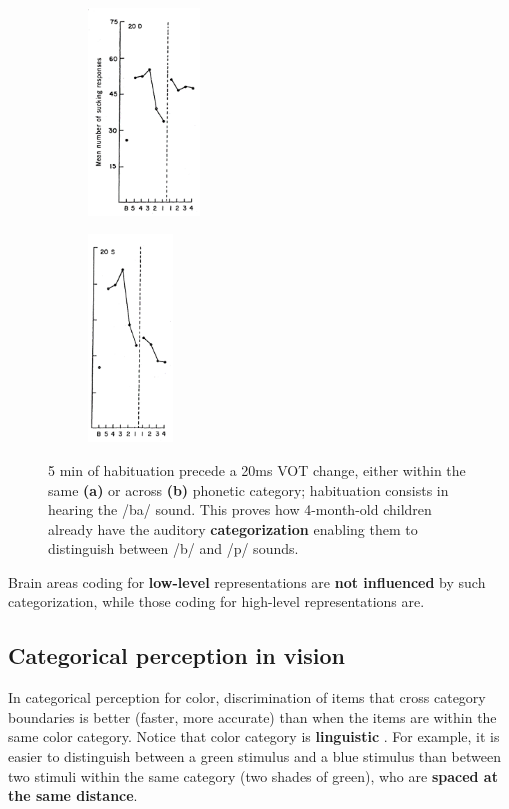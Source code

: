 \begin{figure}
  \begin{subfigure}{.22\textwidth}
  \centering
    \includegraphics[height=5.5cm]{images/eimas_a.png}
    \caption{}
  \end{subfigure}%
  \begin{subfigure}{.2\textwidth}
  \centering
    \includegraphics[height=5.5cm]{images/eimas_b.png}
    \caption{}
  \end{subfigure}
  \caption{5 min of habituation precede a 20ms VOT change, either within the same \textbf{(a)} or across \textbf{(b)} phonetic category; habituation consists in hearing the /ba/ sound. This proves how 4-month-old children already have the auditory \textbf{categorization} enabling them to distinguish between /b/ and /p/ sounds.}
    \label{fig:eimas}
\end{figure}

Brain areas coding for \textbf{low-level} representations are \textbf{not influenced} by such categorization, while those coding for high-level representations are.

\subsection{Categorical perception in vision}
In categorical perception for color, discrimination of items that cross category boundaries is better (faster, more accurate) than when the items are within the same color category. Notice that color category is \textbf{linguistic} \notet.
For example, it is easier to distinguish between a green stimulus and a blue stimulus than between two stimuli within the same category (two shades of green), who are \textbf{spaced at the same distance}.

